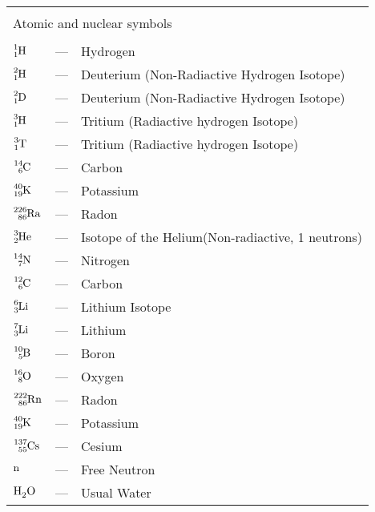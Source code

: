 \begin{longtable}{p{25mm} c p{120mm} }
\\
\\
\multicolumn{3}{l}{Atomic and nuclear symbols}\\
\\
$\ce{^{1}_{1}H}$ & --- & Hydrogen\\
$\ce{^{2}_{1}H}$ & --- & Deuterium (Non-Radiactive Hydrogen Isotope)\\
$\ce{^{2}_{1}D}$ & --- & Deuterium (Non-Radiactive Hydrogen Isotope)\\
$\ce{^{3}_{1}H}$ & --- & Tritium (Radiactive hydrogen Isotope)\\
$\ce{^{3}_{1}T}$ & --- & Tritium (Radiactive hydrogen Isotope)\\
$\ce{^{14}_{6}C}$ & --- & Carbon\\
$\ce{^{40}_{19}K}$ & --- & Potassium\\
$\ce{^{226}_{86}Ra}$ & --- & Radon\\
$\ce{^{3}_{2}He}$ & --- & Isotope of the Helium(Non-radiactive, 1 neutrons)\\
$\ce{^{14}_{7}N}$ & --- & Nitrogen\\
$\ce{^{12}_{6}C}$ & --- & Carbon\\
$\ce{^{6}_{3}Li}$ & --- & Lithium Isotope\\
$\ce{^{7}_{3}Li}$ & --- & Lithium\\
$\ce{^{10}_{5}B}$ & --- & Boron\\
$\ce{^{16}_{8}O}$ & --- & Oxygen\\
$\ce{^{222}_{86}Rn}$ & --- & Radon\\
$\ce{^{40}_{19}K}$ & --- & Potassium\\
$\ce{^{137}_{55}Cs}$ & --- & Cesium\\
$\ce{n}$ & --- & Free Neutron\\
$\ce{H_{2}O}$ & --- & Usual Water\\

\end{longtable}
